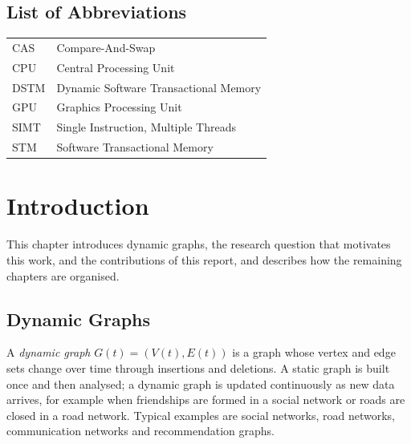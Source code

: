 \documentclass[11pt,a4paper,oneside]{report}
\begin{document}
\begin{singlespace}
\tableofcontents
\clearpage
{}
\listoffigures
\clearpage
{}
\listoftables
\clearpage
\chapter*{List of Abbreviations}
\begin{tabular}{@{}p{2.6cm}l@{}}
CAS & Compare-And-Swap \\
CPU & Central Processing Unit \\
DSTM & Dynamic Software Transactional Memory \\
GPU & Graphics Processing Unit \\
SIMT & Single Instruction, Multiple Threads \\
STM & Software Transactional Memory \\
\end{tabular}
\end{singlespace}
\clearpage

\pagestyle{fancy}
\hypersetup{pageanchor=true}

\chapter{Introduction}
\label{ch:intro}
This chapter introduces dynamic graphs, the research question that motivates this work, and the contributions of this
report, and describes how the remaining chapters are organised.

\section{Dynamic Graphs}
A \emph{dynamic graph} $G(t) = (V(t), E(t))$ is a graph whose vertex and edge sets change over time through insertions
and deletions. A static graph is built once and then analysed; a dynamic graph is updated continuously as new data
arrives, for example when friendships are formed in a social network or roads are closed in a road network. Typical
examples are social networks, road networks, communication networks and recommendation graphs.
\end{document}
